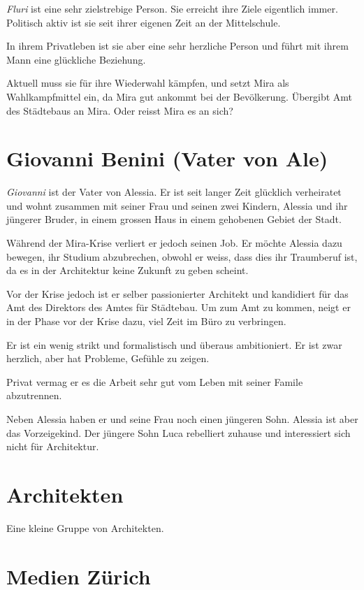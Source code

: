 \documentclass[11pt,a4paper,ngerman]{scrreprt}
\begin{document}
\emph{Fluri} ist eine sehr zielstrebige Person. Sie erreicht ihre Ziele eigentlich
immer. Politisch aktiv ist sie seit ihrer eigenen Zeit an der Mittelschule.

In ihrem Privatleben ist sie aber eine sehr herzliche Person und führt mit ihrem
Mann eine glückliche Beziehung.

Aktuell muss sie für ihre Wiederwahl kämpfen, und setzt Mira als Wahlkampfmittel
ein, da Mira gut ankommt bei der Bevölkerung.  Übergibt Amt des Städtebaus an
Mira. Oder reisst Mira es an sich?

\section*{Giovanni Benini (Vater von Ale)}

\emph{Giovanni} ist der Vater von Alessia. Er ist seit langer Zeit glücklich
verheiratet und wohnt zusammen mit seiner Frau und seinen zwei Kindern, Alessia
und ihr jüngerer Bruder, in einem grossen Haus in einem gehobenen Gebiet der
Stadt.

Während der Mira-Krise verliert er jedoch seinen Job. Er möchte Alessia dazu
bewegen, ihr Studium abzubrechen, obwohl er weiss, dass dies ihr Traumberuf ist,
da es in der Architektur keine Zukunft zu geben scheint.

Vor der Krise jedoch ist er selber passionierter Architekt und kandidiert für
das Amt des Direktors des Amtes für Städtebau. Um zum Amt zu kommen, neigt er in
der Phase vor der Krise dazu, viel Zeit im Büro zu verbringen.

Er ist ein wenig strikt und formalistisch und überaus ambitioniert.  Er ist zwar
herzlich, aber hat Probleme, Gefühle zu zeigen.

Privat vermag er es die Arbeit sehr gut vom Leben mit seiner Famile abzutrennen.

Neben Alessia haben er und seine Frau noch einen jüngeren Sohn. Alessia ist aber
das Vorzeigekind. Der jüngere Sohn Luca rebelliert zuhause und interessiert sich
nicht für Architektur.

\section*{Architekten}

Eine kleine Gruppe von Architekten.

\section*{Medien Zürich}
\end{document}
